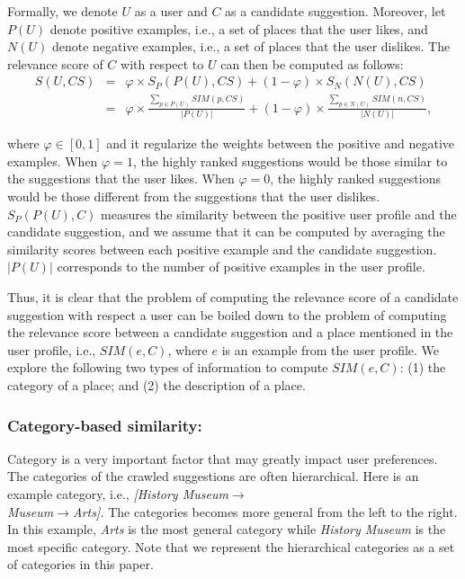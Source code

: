 Formally, we denote $U$ as a user and $C$ as a candidate suggestion. 
Moreover, let $P(U)$ denote positive examples, i.e., a set of places 
that the user likes, and $N(U)$ denote negative examples, i.e., a set 
of places that the user dislikes. The relevance score of $C$ with 
respect to $U$ can then be computed as follows:  
\begin{eqnarray}
    S(U,CS) &=& \varphi \times S_P(P(U),CS) + (1-\varphi) \times S_N(N(U),CS) \\
&=& \varphi \times \frac{\sum_{p \in P(U)}{SIM(p,CS)}}{|P(U)|} 
+ (1-\varphi) \times \frac{\sum_{p \in N(U)}{SIM(n,CS)}}{|N(U)|}, 
\label{eq:13}
\end{eqnarray}

where $\varphi \in [0,1]$ and it regularize the weights between the 
positive and negative examples. When $\varphi=1$, the highly ranked 
suggestions would be those similar to the suggestions that the user likes. 
When $\varphi=0$, the highly ranked suggestions would be those 
different from the suggestions that the user dislikes. 
$S_P(P(U),C)$ measures the similarity between the positive user profile
and the candidate suggestion, and we assume that it can be computed 
by averaging the similarity scores between each positive example and 
the candidate suggestion. $|P(U)|$ corresponds to the number of 
positive examples in the user profile. 

Thus, it is clear that the problem of computing the relevance score 
of a candidate suggestion with respect a user can be boiled down 
to the problem of computing the relevance score between a candidate
suggestion and a place mentioned in the user profile, i.e., $SIM(e,C)$, 
where $e$ is an example from the user profile. We explore the following 
two types of information to compute $SIM(e,C)$: (1) the category 
of a place; and (2) the description of a place. 


\subsubsection{Category-based similarity:}
Category is a very important factor that may greatly
impact user preferences. The categories of the crawled 
suggestions are often hierarchical. Here is an example 
category, i.e.,  
\textit{[History Museum$\to$\\Museum$\to$Arts].}
The categories becomes more general from the left to the right. 
In this example, \textit{Arts} is the most general category
while \textit{History Museum} is the most specific category.
Note that we represent the hierarchical categories
as a set of categories in this paper. 


